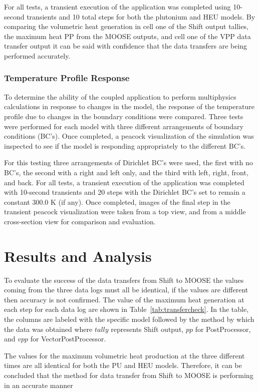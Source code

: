 \documentclass{anstrans}
\begin{document}
For all tests, a transient execution of the application was completed using 10-second transients and 10 total steps for both the plutonium and HEU models. By comparing the volumetric heat generation in cell one of the Shift output tallies, the maximum heat PP from the MOOSE outputs, and cell one of the VPP data transfer output it can be said with confidence that the data transfers are being performed accurately. 

\subsubsection{Temperature Profile Response}
To determine the ability of the coupled application to perform multiphysics calculations in response to changes in the model, the response of the temperature profile due to changes in the boundary conditions were compared. Three tests were performed for each model with three different arrangements of boundary conditions (BC's). Once completed, a peacock visualization of the simulation was inspected to see if the model is responding appropriately to the different BC's. 

For this testing three arrangements of Dirichlet BC's were used, the first with no BC's, the second with a right and left only, and the third with left, right, front, and back. For all tests, a transient execution of the application was completed with 10-second transients and 20 steps with the Dirichlet BC's set to remain a constant 300.0 K (if any). Once completed, images of the final step in the transient peacock visualization were taken from a top view, and from a middle cross-section view for comparison and evaluation.  

\section{Results and Analysis}
To evaluate the success of the data transfers from Shift to MOOSE the values coming from the three data logs must all be identical, if the values are different then accuracy is not confirmed. The value of the maximum heat generation at each step for each data log are shown in Table~\ref{tab:transfercheck}. In the table, the columns are labeled with the specific model followed by the method by which the data was obtained where $tally$ represents Shift output, $pp$ for PostProcessor, and $vpp$ for VectorPostProcessor.

The values for the maximum volumetric heat production at the three different times are all identical for both the PU and HEU models. Therefore, it can be concluded that the method for data transfer from Shift to MOOSE is performing in an accurate manner
\end{document}
